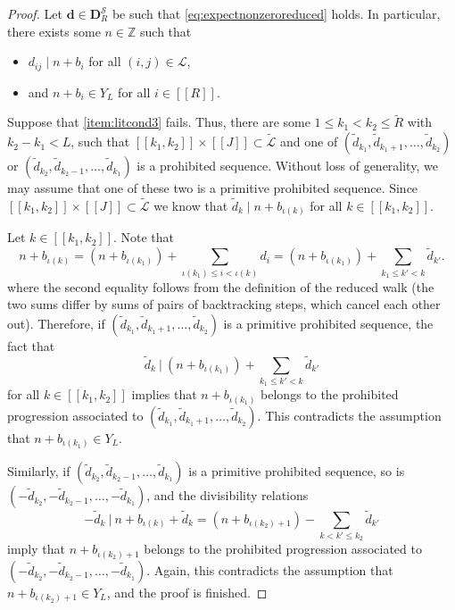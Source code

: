 \documentclass[11pt]{amsart}
\theoremstyle{definition}
\renewcommand{\leq}{\leqslant}
\newcommand{\interval}[2]{[\![#1,#2]\!] }
\newcommand{\sinterval}[1]{[\![#1]\!] }
\newcommand{\Z}{\mathbb{Z}}
\renewcommand{\d}{\boldsymbol{d}}
\newcommand{\pcomp}[2]{d_{#1#2}}
\newcommand{\sommespart}{b}
\newcommand{\bmid}{\  \Big\vert}
\newcommand{\lit}{\mathcal{L}}
\newcommand{\s}{\mathcal{S}}
\newcommand{\fancyD}{\mathbf{D}}
\newcommand{\DsR}{\fancyD^{\s}_{\!\tupsize}}
\newcommand{\elln}{L}
\newcommand{\Y}{Y_{\!\elln}}
\newcommand{\newR}{\sinterval{J}}
\newcommand{\redd}{\widetilde{d}}
\newcommand{\reducedlit}{\widetilde{\lit}}
\newcommand{\tupsize}{R}
\newcommand{\myfunction}{\iota}
\begin{document}
\begin{proof}
Let $\d\in \DsR$ be such that \cref{eq:expectnonzeroreduced} holds. In particular, there exists some $n\in \Z$ such that 
\begin{itemize}
	\item $\pcomp{i}{j}\mid n+\sommespart_i$ for all $(i,j)\in \lit$,
	\item and $n+\sommespart_i\in \Y$ for all $i\in \sinterval{\tupsize}$.
\end{itemize}

Suppose that \cref{item:litcond3} fails. Thus, there are some $1\leq k_1 < k_2\leq \widetilde{\tupsize}$ with $k_2-k_1<\elln$, such that ${\interval{k_1}{k_2} \times \newR \subset \reducedlit}$ and one of $(\redd_{k_1}, \redd_{k_1+1}, \ldots, \redd_{k_2})$ or $(\redd_{k_2}, \redd_{k_2-1}, \ldots, \redd_{k_1})$ is a prohibited sequence. Without loss of generality, we may assume that one of these two is a primitive prohibited sequence. Since ${\interval{k_1}{k_2} \times \newR \subset \reducedlit}$ we know that $\redd_{k} \mid n+\sommespart_{\myfunction(k)}$ for all $k\in \interval{k_1}{k_2}$. 

Let $k\in \interval{k_1}{k_2}$. Note that
\begin{equation*}
	n+\sommespart_{\myfunction(k)} = (n+\sommespart_{\myfunction(k_1)}) + \sum_{\myfunction(k_1)\leq i < \myfunction(k) }d_i = (n+\sommespart_{\myfunction(k_1)}) + \sum_{k_1\leq k' < k }\redd_{k'}.%
\end{equation*}
where the second equality follows from the definition of the reduced walk (the two sums differ by sums of pairs of backtracking steps, which cancel each other out).
Therefore, if $(\redd_{k_1}, \redd_{k_1+1}, \ldots, \redd_{k_2})$ is a primitive prohibited sequence, the fact that 
\begin{equation*}
	\redd_{k} \bmid \ (n+\sommespart_{\myfunction(k_1)}) + \sum_{k_1\leq k' < k }\redd_{k'}
\end{equation*}
for all $k\in \interval{k_1}{k_2}$ implies that $n+\sommespart_{\myfunction(k_1)}$ belongs to the prohibited progression associated to $(\redd_{k_1}, \redd_{k_1+1}, \ldots, \redd_{k_2})$. This contradicts the assumption that $n+\sommespart_{\myfunction(k_1)}\in \Y$. 

Similarly, if $(\redd_{k_2}, \redd_{k_2-1}, \ldots, \redd_{k_1})$ is a primitive prohibited sequence, so is $(-\redd_{k_2}, -\redd_{k_2-1}, \ldots, -\redd_{k_1})$, and the divisibility relations 
\begin{equation*}
	-\redd_{k} \bmid \ n+\sommespart_{\myfunction(k)} + \redd_{k} = (n+\sommespart_{\myfunction(k_2)+1}) - \sum_{k < k' \leq k_2 }\redd_{k'}
\end{equation*}
imply that $n+\sommespart_{\myfunction(k_2)+1}$ belongs to the prohibited progression associated to $(-\redd_{k_2}, -\redd_{k_2-1}, \ldots, -\redd_{k_1})$. Again, this contradicts the assumption that $n+\sommespart_{\myfunction(k_2)+1} \in \Y$, and the proof is finished.
\end{proof}
\end{document}
